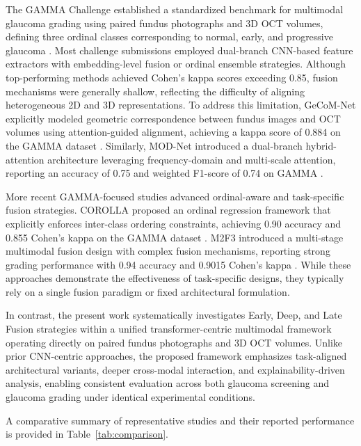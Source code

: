 \documentclass[preprint,12pt]{elsarticle}
\begin{document}
The GAMMA Challenge established a standardized benchmark for multimodal glaucoma grading using paired fundus photographs and 3D OCT volumes, defining three ordinal classes corresponding to normal, early, and progressive glaucoma \cite{wu2023gamma}. Most challenge submissions employed dual-branch CNN-based feature extractors with embedding-level fusion or ordinal ensemble strategies. Although top-performing methods achieved Cohen’s kappa scores exceeding 0.85, fusion mechanisms were generally shallow, reflecting the difficulty of aligning heterogeneous 2D and 3D representations. To address this limitation, GeCoM-Net explicitly modeled geometric correspondence between fundus images and OCT volumes using attention-guided alignment, achieving a kappa score of 0.884 on the GAMMA dataset \cite{wang2024geometric}. Similarly, MOD-Net introduced a dual-branch hybrid-attention architecture leveraging frequency-domain and multi-scale attention, reporting an accuracy of 0.75 and weighted F1-score of 0.74 on GAMMA \cite{wang2025dual}.

More recent GAMMA-focused studies advanced ordinal-aware and task-specific fusion strategies. COROLLA proposed an ordinal regression framework that explicitly enforces inter-class ordering constraints, achieving 0.90 accuracy and 0.855 Cohen’s kappa on the GAMMA dataset \cite{cai2022corolla}. M2F3 introduced a multi-stage multimodal fusion design with complex fusion mechanisms, reporting strong grading performance with 0.94 accuracy and 0.9015 Cohen’s kappa \cite{zhao2025enhancing}. While these approaches demonstrate the effectiveness of task-specific designs, they typically rely on a single fusion paradigm or fixed architectural formulation.

In contrast, the present work systematically investigates Early, Deep, and Late Fusion strategies within a unified transformer-centric multimodal framework operating directly on paired fundus photographs and 3D OCT volumes. Unlike prior CNN-centric approaches, the proposed framework emphasizes task-aligned architectural variants, deeper cross-modal interaction, and explainability-driven analysis, enabling consistent evaluation across both glaucoma screening and glaucoma grading under identical experimental conditions.

A comparative summary of representative studies and their reported performance is provided in Table~\ref{tab:comparison}.
\end{document}
